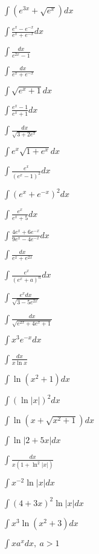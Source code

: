 \begin{multicols}{2}
$\displaystyle \int (e^{3x}+\sqrt{e^x})dx$

$\displaystyle \int \frac{e^x-e^{-x}}{e^x+e^{-x}}dx$

$\displaystyle \int \frac{dx}{e^{2x}-1}$

$\displaystyle \int \frac{dx}{e^x+e^{-x}}$

$\displaystyle \int \sqrt{e^x+1}dx$

$\displaystyle \int \frac{e^x-1}{e^x+1}dx$

$\displaystyle \int \frac{dx}{\sqrt{3+2e^x}}$

$\displaystyle \int e^x\sqrt{1+e^x}dx$

$\displaystyle \int \frac{e^x}{(e^x-1)^2}dx$

$\displaystyle \int (e^x+e^{-x})^2dx$

$\displaystyle \int \frac{e^x}{e^x+5}dx$

$\displaystyle \int \frac{4e^x+6e^{-x}}{9e^x-4e^{-x}}dx$

$\displaystyle \int \frac{dx}{e^x+e^{2x}}$

$\displaystyle \int \frac{e^x}{(e^x+a)^n}dx$

$\displaystyle \int \frac{e^xdx}{\sqrt{3-5e^{2x}}}$

$\displaystyle \int \frac{dx}{\sqrt{e^{2x}+4e^x+1}}$

$\displaystyle \int x^3e^{-x}dx$

$\displaystyle \int \frac{dx}{x\ln x}$

$\displaystyle \int \ln(x^2+1)dx$

$\displaystyle \int (\ln|x|)^2 dx$

$\displaystyle \int \ln(x+\sqrt{x^2+1})dx$

$\displaystyle \int \ln|2+5x|dx$

$\displaystyle \int \frac{dx}{x(1+\ln^2|x|)}$

$\displaystyle \int x^{-2}\ln|x|dx$

$\displaystyle \int (4+3x)^2\ln|x|dx$

$\displaystyle \int x^3\ln(x^2+3)dx$

$\displaystyle \int xa^xdx, \ a>1$
\end{multicols}
